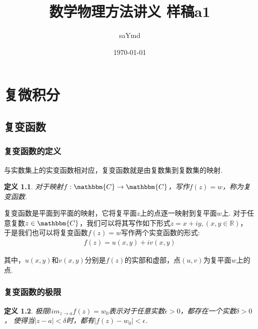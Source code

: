 \documentclass[12pt, a4paper]{ctexbook}
\author{saYmd} %
\title{数学物理方法讲义 样稿a1} %
\date{\today} %
\newtheorem{definition}{定义}[chapter] %
\begin{document}
    \maketitle
    \tableofcontents

    \chapter{复微积分}


        \section{复变函数}

            \subsection{复变函数的定义}
                与实数集上的实变函数相对应，复变函数就是由复数集到复数集的映射.\par
                \begin{definition}
                    \label{def:complex_function}
                    对于映射$f: \mathbbm{C} \to \mathbbm{C}$，写作$f(z)=w$，称为复变函数.
                \end{definition}

                复变函数是平面到平面的映射，它将复平面$z$上的点逐一映射到复平面$w$上.
                对于任意复数$z \in \mathbbm{C}$，我们可以将其写作如下形式$z = x + iy,(x,y \in \mathbb{R})$，
                于是我们也可以将复变函数$f(z) = w$写作两个实变函数的形式:
                \begin{align}
                    f(z) = u(x,y) + iv(x,y)
                \end{align}

                其中，$u(x,y)$和$v(x,y)$分别是$f(z)$的实部和虚部，点$(u, v)$为复平面$w$上的点.

            \subsection{复变函数的极限}
                \begin{definition}
                    \label{def:limits_of_complex_function}
                    极限$lim_{z \to a}f(z) = w_0$表示对于任意实数$\epsilon > 0$，都存在一个实数$\delta > 0$，
                    使得当$|z - a| < \delta$时，都有$|f(z) - w_0| < \epsilon$.
                \end{definition}
\end{document}
